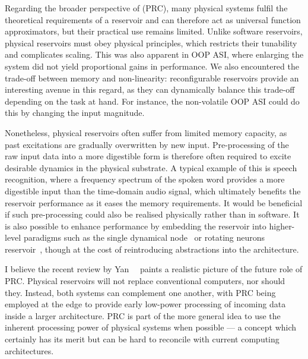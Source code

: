 Regarding the broader perspective of  (PRC), many physical systems fulfil the theoretical requirements of a reservoir and can therefore act as universal function approximators, but their practical use remains limited.
Unlike software reservoirs, physical reservoirs must obey physical principles, which restricts their tunability and complicates scaling.
This was also apparent in OOP ASI, where enlarging the system did not yield proportional gains in performance.
We also encountered the trade-off between memory and non-linearity: reconfigurable reservoirs provide an interesting avenue in this regard, as they can dynamically balance this trade-off depending on the task at hand.
For instance, the non-volatile OOP ASI could do this by changing the input magnitude. \par
Nonetheless, physical reservoirs often suffer from limited memory capacity, as past excitations are gradually overwritten by new input.
Pre-processing of the raw input data into a more digestible form is therefore often required to excite desirable dynamics in the physical substrate.
A typical example of this is speech recognition, where a frequency spectrum of the spoken word provides a more digestible input than the time-domain audio signal, which ultimately benefits the reservoir performance as it eases the memory requirements.
It would be beneficial if such pre-processing could also be realised physically rather than in software.
It is also possible to enhance performance by embedding the reservoir into higher-level paradigms such as the single dynamical node~\cite{appeltant2011information} or rotating neurons reservoir~\cite{RotatingNeuronsRC}, though at the cost of reintroducing abstractions into the architecture. \par
I believe the recent review by Yan~\etal{}~\cite{ChallengesFutureRC} paints a realistic picture of the future role of PRC.
Physical reservoirs will not replace conventional computers, nor should they.
Instead, both systems can complement one another, with PRC being employed at the edge to provide early low-power processing of incoming data inside a larger architecture.
PRC is part of the more general idea to use the inherent processing power of physical systems when possible --- a concept which certainly has its merit but can be hard to reconcile with current computing architectures. \\\par

